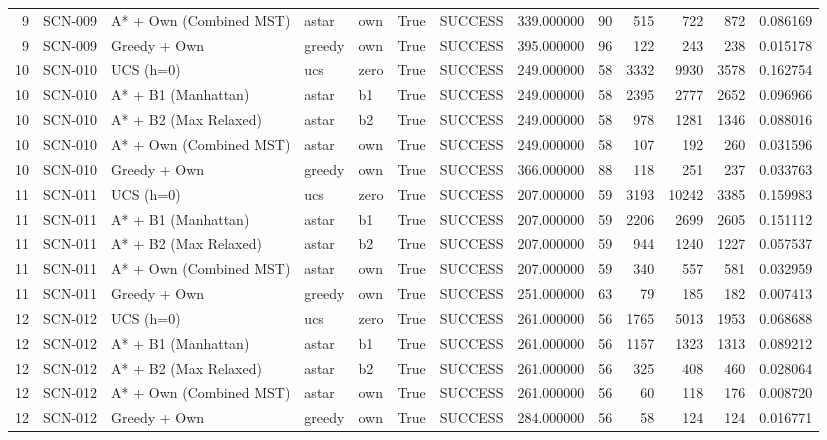 \begin{table}[htbp]
\begin{tabular}{rllllrlrrrrrr}
9 & SCN-009 & A* + Own (Combined MST) & astar & own & True & SUCCESS & 339.000000 & 90 & 515 & 722 & 872 & 0.086169 \\
9 & SCN-009 & Greedy + Own & greedy & own & True & SUCCESS & 395.000000 & 96 & 122 & 243 & 238 & 0.015178 \\
10 & SCN-010 & UCS (h=0) & ucs & zero & True & SUCCESS & 249.000000 & 58 & 3332 & 9930 & 3578 & 0.162754 \\
10 & SCN-010 & A* + B1 (Manhattan) & astar & b1 & True & SUCCESS & 249.000000 & 58 & 2395 & 2777 & 2652 & 0.096966 \\
10 & SCN-010 & A* + B2 (Max Relaxed) & astar & b2 & True & SUCCESS & 249.000000 & 58 & 978 & 1281 & 1346 & 0.088016 \\
10 & SCN-010 & A* + Own (Combined MST) & astar & own & True & SUCCESS & 249.000000 & 58 & 107 & 192 & 260 & 0.031596 \\
10 & SCN-010 & Greedy + Own & greedy & own & True & SUCCESS & 366.000000 & 88 & 118 & 251 & 237 & 0.033763 \\
11 & SCN-011 & UCS (h=0) & ucs & zero & True & SUCCESS & 207.000000 & 59 & 3193 & 10242 & 3385 & 0.159983 \\
11 & SCN-011 & A* + B1 (Manhattan) & astar & b1 & True & SUCCESS & 207.000000 & 59 & 2206 & 2699 & 2605 & 0.151112 \\
11 & SCN-011 & A* + B2 (Max Relaxed) & astar & b2 & True & SUCCESS & 207.000000 & 59 & 944 & 1240 & 1227 & 0.057537 \\
11 & SCN-011 & A* + Own (Combined MST) & astar & own & True & SUCCESS & 207.000000 & 59 & 340 & 557 & 581 & 0.032959 \\
11 & SCN-011 & Greedy + Own & greedy & own & True & SUCCESS & 251.000000 & 63 & 79 & 185 & 182 & 0.007413 \\
12 & SCN-012 & UCS (h=0) & ucs & zero & True & SUCCESS & 261.000000 & 56 & 1765 & 5013 & 1953 & 0.068688 \\
12 & SCN-012 & A* + B1 (Manhattan) & astar & b1 & True & SUCCESS & 261.000000 & 56 & 1157 & 1323 & 1313 & 0.089212 \\
12 & SCN-012 & A* + B2 (Max Relaxed) & astar & b2 & True & SUCCESS & 261.000000 & 56 & 325 & 408 & 460 & 0.028064 \\
12 & SCN-012 & A* + Own (Combined MST) & astar & own & True & SUCCESS & 261.000000 & 56 & 60 & 118 & 176 & 0.008720 \\
12 & SCN-012 & Greedy + Own & greedy & own & True & SUCCESS & 284.000000 & 56 & 58 & 124 & 124 & 0.016771 \\

\end{tabular}
\end{table}
